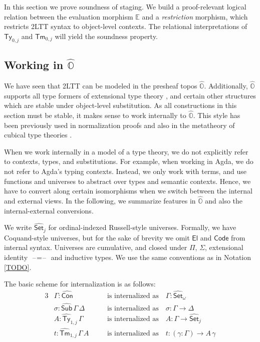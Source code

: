 \documentclass[acmsmall]{acmart}
\newcommand{\msf}[1]{\mathsf{#1}}
\newcommand{\mbb}[1]{\mathbb{#1}}
\newcommand{\wh}[1]{\widehat{#1}}
\newcommand{\Code}{\msf{Code}}
\newcommand{\El}{\msf{El}}
\newcommand{\mbbo}{\mbb{O}}
\newcommand{\Ty}{\msf{Ty}}
\newcommand{\Tm}{\msf{Tm}}
\newcommand{\hCon}{\wh{\msf{Con}}}
\newcommand{\hSub}{\wh{\msf{Sub}}}
\newcommand{\hTy}{\wh{\msf{Ty}}}
\newcommand{\hTm}{\wh{\msf{Tm}}}
\newcommand{\Set}{\mathsf{Set}}
\newcommand{\blank}{{\mathord{\hspace{1pt}\text{--}\hspace{1pt}}}}
\newcommand{\hato}{\bm\hat{\mbbo}}
\newcommand{\ev}{\mbb{E}}
\theoremstyle{remark}
\newcommand{\whset}{\wh{\Set}}
\begin{document}
In this section we prove soundness of staging. We build a proof-relevant logical
relation between the evaluation morphism $\ev$ and a \emph{restriction}
morphism, which restricts 2LTT syntax to object-level contexts. The relational
interpretations of $\Ty_{0,j}$ and $\Tm_{0,j}$ will yield the soundness
property.

\subsection{Working in $\hat{\mbbo}$}

We have seen that 2LTT can be modeled in the presheaf topos
$\hato$. Additionally, $\hato$ supports all type formers of extensional type
theory \cite{TODO}, and certain other structures which are stable under
object-level substitution. As all constructions in this section must be stable,
it makes sense to work internally to $\hato$. This style has been previously
used in normalization proofs \cite{TODO} and also in the metatheory of cubical
type theories \cite{TODO}.

When we work internally in a model of a type theory, we do not explicitly refer
to contexts, types, and substitutions. For example, when working in Agda, we do
not refer to Agda's typing contexts. Instead, we only work with terms, and use
functions and universes to abstract over types and semantic contexts. Hence, we
have to convert along certain isomorphisms when we switch between the internal
and external views. In the following, we summarize features in $\hato$ and also
the internal-external conversions.

We write $\whset_j$ for ordinal-indexed Russell-style universes. Formally, we
have Coquand-style universes, but for the sake of brevity we omit $\El$ and
$\Code$ from internal syntax. Universes are cumulative, and closed under $\Pi$,
$\Sigma$, extensional identity $\blank\!=\!\blank$ and inductive types. We use
the same conventions as in Notation \ref{TODO}.

\noindent The basic scheme for internalization is as follows:
\begin{alignat*}{3}
  & \Gamma : \hCon                  && \hspace{1em}\text{is internalized as}\hspace{1em} \Gamma : \whset_\omega\\
  & \sigma : \hSub\,\Gamma\,\Delta  && \hspace{1em}\text{is internalized as}\hspace{1em} \sigma : \Gamma \to \Delta\\
  & A : \hTy_{1,j}\,\Gamma           && \hspace{1em}\text{is internalized as}\hspace{1em} A      : \Gamma \to \whset_j \\
  & t : \hTm_{1,j}\,\Gamma\,A        && \hspace{1em}\text{is internalized as}\hspace{1em} t      : (\gamma : \Gamma) \to A\,\gamma
\end{alignat*}
\end{document}

